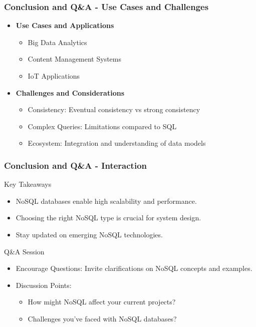 \documentclass[aspectratio=169]{beamer}
\begin{document}
\begin{frame}[fragile]
    \frametitle{Conclusion and Q\&A - Use Cases and Challenges}
    \begin{itemize}
        \item \textbf{Use Cases and Applications}
            \begin{itemize}
                \item Big Data Analytics
                \item Content Management Systems
                \item IoT Applications
            \end{itemize}
        \item \textbf{Challenges and Considerations}
            \begin{itemize}
                \item Consistency: Eventual consistency vs strong consistency
                \item Complex Queries: Limitations compared to SQL
                \item Ecosystem: Integration and understanding of data models
            \end{itemize}
    \end{itemize}
\end{frame}

\begin{frame}[fragile]
    \frametitle{Conclusion and Q\&A - Interaction}
    \begin{block}{Key Takeaways}
        \begin{itemize}
            \item NoSQL databases enable high scalability and performance.
            \item Choosing the right NoSQL type is crucial for system design.
            \item Stay updated on emerging NoSQL technologies.
        \end{itemize}
    \end{block}
    \begin{block}{Q\&A Session}
        \begin{itemize}
            \item Encourage Questions: Invite clarifications on NoSQL concepts and examples.
            \item Discussion Points:
                \begin{itemize}
                    \item How might NoSQL affect your current projects?
                    \item Challenges you've faced with NoSQL databases?
                \end{itemize}
        \end{itemize}
    \end{block}
\end{frame}
\end{document}
